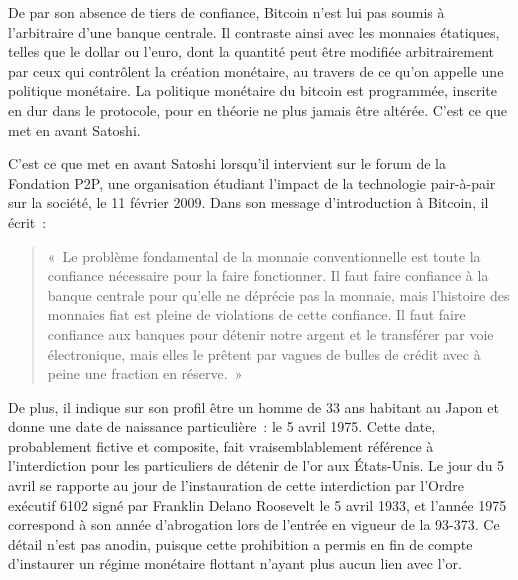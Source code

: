 
De par son absence de tiers de confiance, Bitcoin n'est lui pas soumis à l'arbitraire d'une banque centrale. Il contraste ainsi avec les monnaies étatiques, telles que le dollar ou l'euro, dont la quantité peut être modifiée arbitrairement par ceux qui contrôlent la création monétaire, au travers de ce qu'on appelle une politique monétaire. La politique monétaire du bitcoin est programmée, inscrite en dur dans le protocole, pour en théorie ne plus jamais être altérée. C'est ce que met en avant Satoshi.

C'est ce que met en avant Satoshi lorsqu'il intervient sur le forum de la Fondation P2P, une organisation étudiant l'impact de la technologie pair-à-pair sur la société, le 11 février 2009. Dans son message d'introduction à Bitcoin, il écrit~:

\begin{quote}
«~Le problème fondamental de la monnaie conventionnelle est toute la confiance nécessaire pour la faire fonctionner. Il faut faire confiance à la banque centrale pour qu'elle ne déprécie pas la monnaie, mais l'histoire des monnaies fiat est pleine de violations de cette confiance. Il faut faire confiance aux banques pour détenir notre argent et le transférer par voie électronique, mais elles le prêtent par vagues de bulles de crédit avec à peine une fraction en réserve.~»
\end{quote}

De plus, il indique sur son profil être un homme de 33 ans habitant au Japon et donne une date de naissance particulière~: le 5 avril 1975. Cette date, probablement fictive et composite, fait vraisemblablement référence à l'interdiction pour les particuliers de détenir de l'or aux États-Unis. Le jour du 5 avril se rapporte au jour de l'instauration de cette interdiction par l'Ordre exécutif 6102 signé par Franklin Delano Roosevelt le 5 avril 1933, et l'année 1975 correspond à son année d'abrogation lors de l'entrée en vigueur de la  93-373. Ce détail n'est pas anodin, puisque cette prohibition a permis en fin de compte d'instaurer un régime monétaire flottant n'ayant plus aucun lien avec l'or.

